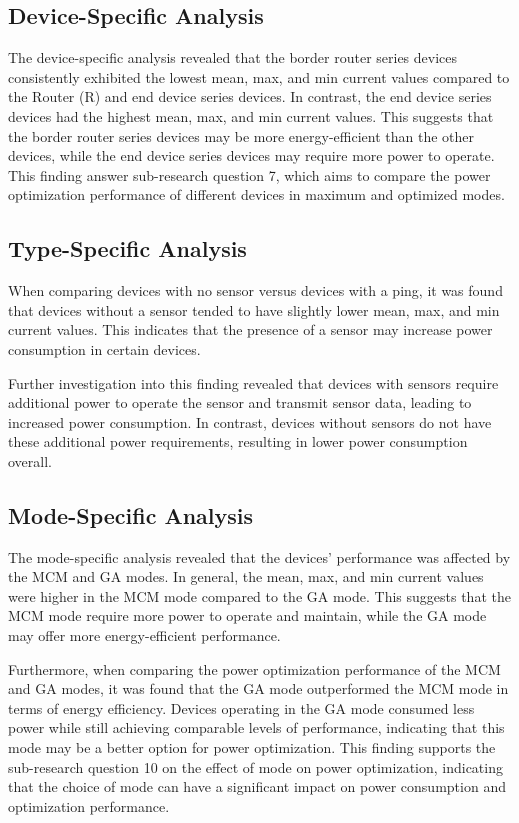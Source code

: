 \subsection{Device-Specific Analysis}

The device-specific analysis revealed that the border router series devices consistently exhibited the lowest mean, max, and min current values compared to the Router (R) and end device series devices. In contrast, the end device series devices had the highest mean, max, and min current values. This suggests that the border router series devices may be more energy-efficient than the other devices, while the end device series devices may require more power to operate. This finding answer sub-research question 7, which aims to compare the power optimization performance of different devices in maximum and optimized modes.


\subsection{Type-Specific Analysis}

When comparing devices with no sensor versus devices with a ping, it was found that devices without a sensor tended to have slightly lower mean, max, and min current values. This indicates that the presence of a sensor may increase power consumption in certain devices.

Further investigation into this finding revealed that devices with sensors require additional power to operate the sensor and transmit sensor data, leading to increased power consumption. In contrast, devices without sensors do not have these additional power requirements, resulting in lower power consumption overall.


\subsection{Mode-Specific Analysis}

The mode-specific analysis revealed that the devices' performance was affected by the \gls{MCM} and \gls{GA} modes. In general, the mean, max, and min current values were higher in the \gls{MCM} mode compared to the \gls{GA} mode. This suggests that the \gls{MCM} mode require more power to operate and maintain, while the \gls{GA} mode may offer more energy-efficient performance.

Furthermore, when comparing the power optimization performance of the \gls{MCM} and \gls{GA} modes, it was found that the \gls{GA} mode outperformed the \gls{MCM} mode in terms of energy efficiency. Devices operating in the \gls{GA} mode consumed less power while still achieving comparable levels of performance, indicating that this mode may be a better option for power optimization. This finding supports the sub-research question 10 on the effect of mode on power optimization, indicating that the choice of mode can have a significant impact on power consumption and optimization performance.


